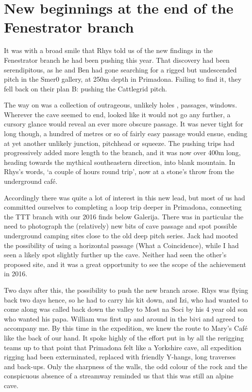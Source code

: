 \section{New beginnings at the end of the Fenestrator branch}

It was with a broad smile that Rhys told us of the new findings in the Fenestrator branch he had been pushing this year. That discovery had been serendipitous, as he and Ben had gone searching for a rigged but undescended pitch in the Smer0 gallery, at 250m depth in Primadona. Failing to find it, they fell back on their plan B: pushing the Cattlegrid pitch.

The way on was a collection of  outrageous, unlikely holes , passages, windows. Wherever the cave seemed to end, looked like it would not go any further, a cursory glance would reveal an ever more obscure passage. It was never tight for long though, a hundred of metres or so of fairly easy passage would ensue, ending at yet another unlikely junction, pitchhead or squeeze. The pushing trips had progressively added more length to the branch, and it was now over 400m long, heading towards the mythical southeastern direction, into blank mountain. In Rhys’s words, ‘a couple of hours round trip’, now at a stone’s throw from the underground café. 

Accordingly there was quite a lot of interest in this new lead, but most of us had committed ourselves to completing a loop trip  deeper in Primadona, connecting the TTT branch with our 2016 finds below Galerija. There was in particular the need to photograph the (relatively) new bits of cave passage and spot possible underground camping sites close to the old deep pitch series. Jack had mooted the possibility of using a horizontal passage (What a Coincidence), while I had seen a likely spot slightly further up the cave. Neither had seen the other’s proposed site, and it was a great opportunity to see the scope of the achievement in 2016. 

Two days after this, the possibility to push the new branch arose.  Rhys was flying back two days hence, so he had to carry his kit down, and Izi, who had wanted to come along was called back down the valley to Most na Soci by his 4 year old son who wanted his papa. William was first up and around in the bivi and agreed to accompany me. By this time in the expedition, we knew the route to Mary’s Café like the back of our hand. It spoke highly of the effort put in by all the rerigging teams up to that point that Primadona felt like a Yorkshire cave, all expedition rigging had been exterminated, replaced with friendly Y-hangs, long traverses and back-ups.  Only the sharpness of the walls, the odd colour of the rock and the conspicuous absence of a streamway reminded us that this was still an alpine cave.

